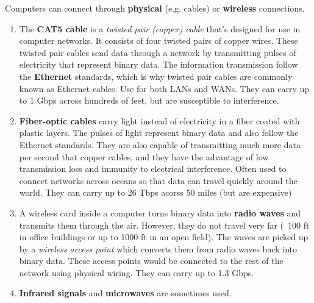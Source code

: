 \documentclass[a4paper, 12pt]{report}
\theoremstyle{remark}
\theoremstyle{definition}
\begin{document}
Computers can connect through \textbf{physical} (e.g. cables) or \textbf{wireless} connections. 
\begin{enumerate}
    \item The \textbf{CAT5 cable} is a \textit{twisted pair (copper) cable} that's designed for use in computer networks. It consists of four twisted pairs of copper wires. These twisted pair cables send data through a network by transmitting pulses of electricity that represent binary data. The information transmission follow the \textbf{Ethernet} standards, which is why twisted pair cables are commonly known as Ethernet cables. Use for both LANs and WANs. They can carry up to 1 Gbps across hundreds of feet, but are susceptible to interference. 
    \item \textbf{Fiber-optic cables} carry light instead of electricity in a fiber coated with plastic layers. The pulses of light represent binary data and also follow the Ethernet standards. They are also capable of transmitting much more data per second that copper cables, and they have the advantage of low transmission loss and immunity to electrical interference. Often used to connect networks across oceans so that data can travel quickly around the world. They can carry up to 26 Tbps acorss 50 miles (but are expensive)
    \item A wireless card inside a computer turns binary data into \textbf{radio waves} and transmits them through the air. However, they do not travel very far (~100 ft in office buildings or up to 1000 ft in an open field). The waves are picked up by a \textit{wireless access point} which converts them from radio waves back into binary data. These access points would be connected to the rest of the network using physical wiring. They can carry up to 1.3 Gbps. 
    \item \textbf{Infrared signals} and \textbf{microwaves} are sometimes used. 
\end{enumerate}
\end{document}
